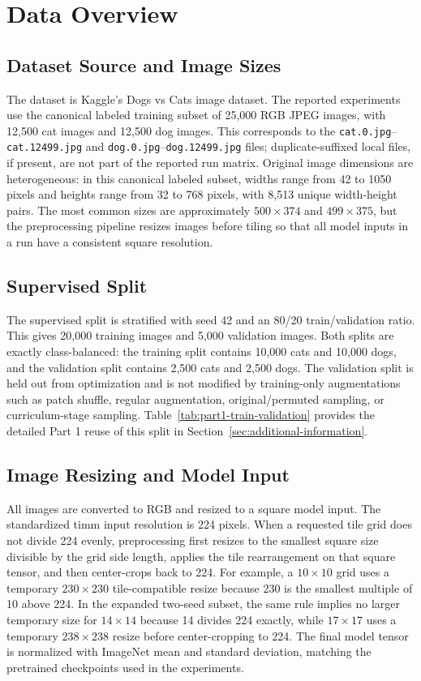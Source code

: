\documentclass[12pt]{article}
\begin{document}
\section{Data Overview}

\subsection{Dataset Source and Image Sizes}

The dataset is Kaggle's Dogs vs Cats image dataset. The reported experiments use the canonical labeled training subset of 25,000 RGB JPEG images, with 12,500 cat images and 12,500 dog images. This corresponds to the \texttt{cat.0.jpg}--\texttt{cat.12499.jpg} and \texttt{dog.0.jpg}--\texttt{dog.12499.jpg} files; duplicate-suffixed local files, if present, are not part of the reported run matrix. Original image dimensions are heterogeneous: in this canonical labeled subset, widths range from 42 to 1050 pixels and heights range from 32 to 768 pixels, with 8,513 unique width-height pairs. The most common sizes are approximately $500 \times 374$ and $499 \times 375$, but the preprocessing pipeline resizes images before tiling so that all model inputs in a run have a consistent square resolution.

\subsection{Supervised Split}

The supervised split is stratified with seed 42 and an 80/20 train/validation ratio. This gives 20,000 training images and 5,000 validation images. Both splits are exactly class-balanced: the training split contains 10,000 cats and 10,000 dogs, and the validation split contains 2,500 cats and 2,500 dogs. The validation split is held out from optimization and is not modified by training-only augmentations such as patch shuffle, regular augmentation, original/permuted sampling, or curriculum-stage sampling. Table~\ref{tab:part1-train-validation} provides the detailed Part 1 reuse of this split in Section~\ref{sec:additional-information}.

\subsection{Image Resizing and Model Input}

All images are converted to RGB and resized to a square model input. The standardized timm input resolution is 224 pixels. When a requested tile grid does not divide 224 evenly, preprocessing first resizes to the smallest square size divisible by the grid side length, applies the tile rearrangement on that square tensor, and then center-crops back to 224. For example, a $10 \times 10$ grid uses a temporary $230 \times 230$ tile-compatible resize because 230 is the smallest multiple of 10 above 224. In the expanded two-seed subset, the same rule implies no larger temporary size for $14 \times 14$ because 14 divides 224 exactly, while $17 \times 17$ uses a temporary $238 \times 238$ resize before center-cropping to 224. The final model tensor is normalized with ImageNet mean and standard deviation, matching the pretrained checkpoints used in the experiments.
\end{document}
